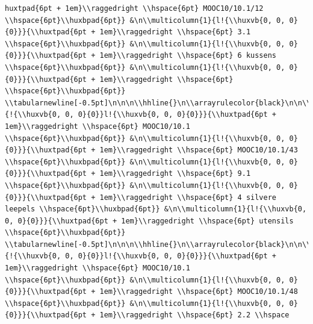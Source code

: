 \documentclass[11pt,preprint, authoryear]{elsarticle}
\numberwithin{equation}{section}
\numberwithin{figure}{section}
\numberwithin{table}{section}
\begin{document}
\begin{verbatim}
huxtpad{6pt + 1em}\\raggedright \\hspace{6pt} MOOC10/10.1/12 \\hspace{6pt}\\huxbpad{6pt}} &\n\\multicolumn{1}{l!{\\huxvb{0, 0, 0}{0}}}{\\huxtpad{6pt + 1em}\\raggedright \\hspace{6pt} 3.1 \\hspace{6pt}\\huxbpad{6pt}} &\n\\multicolumn{1}{l!{\\huxvb{0, 0, 0}{0}}}{\\huxtpad{6pt + 1em}\\raggedright \\hspace{6pt} 6 kussens \\hspace{6pt}\\huxbpad{6pt}} &\n\\multicolumn{1}{l!{\\huxvb{0, 0, 0}{0}}}{\\huxtpad{6pt + 1em}\\raggedright \\hspace{6pt}  \\hspace{6pt}\\huxbpad{6pt}} \\tabularnewline[-0.5pt]\n\n\n\\hhline{}\n\\arrayrulecolor{black}\n\n\\multicolumn{1}{!{\\huxvb{0, 0, 0}{0}}l!{\\huxvb{0, 0, 0}{0}}}{\\huxtpad{6pt + 1em}\\raggedright \\hspace{6pt} MOOC10/10.1 \\hspace{6pt}\\huxbpad{6pt}} &\n\\multicolumn{1}{l!{\\huxvb{0, 0, 0}{0}}}{\\huxtpad{6pt + 1em}\\raggedright \\hspace{6pt} MOOC10/10.1/43 \\hspace{6pt}\\huxbpad{6pt}} &\n\\multicolumn{1}{l!{\\huxvb{0, 0, 0}{0}}}{\\huxtpad{6pt + 1em}\\raggedright \\hspace{6pt} 9.1 \\hspace{6pt}\\huxbpad{6pt}} &\n\\multicolumn{1}{l!{\\huxvb{0, 0, 0}{0}}}{\\huxtpad{6pt + 1em}\\raggedright \\hspace{6pt} 4 silvere leepels \\hspace{6pt}\\huxbpad{6pt}} &\n\\multicolumn{1}{l!{\\huxvb{0, 0, 0}{0}}}{\\huxtpad{6pt + 1em}\\raggedright \\hspace{6pt} utensils \\hspace{6pt}\\huxbpad{6pt}} \\tabularnewline[-0.5pt]\n\n\n\\hhline{}\n\\arrayrulecolor{black}\n\n\\multicolumn{1}{!{\\huxvb{0, 0, 0}{0}}l!{\\huxvb{0, 0, 0}{0}}}{\\huxtpad{6pt + 1em}\\raggedright \\hspace{6pt} MOOC10/10.1 \\hspace{6pt}\\huxbpad{6pt}} &\n\\multicolumn{1}{l!{\\huxvb{0, 0, 0}{0}}}{\\huxtpad{6pt + 1em}\\raggedright \\hspace{6pt} MOOC10/10.1/48 \\hspace{6pt}\\huxbpad{6pt}} &\n\\multicolumn{1}{l!{\\huxvb{0, 0, 0}{0}}}{\\huxtpad{6pt + 1em}\\raggedright \\hspace{6pt} 2.2 \\hspace
\end{verbatim}
\end{document}
